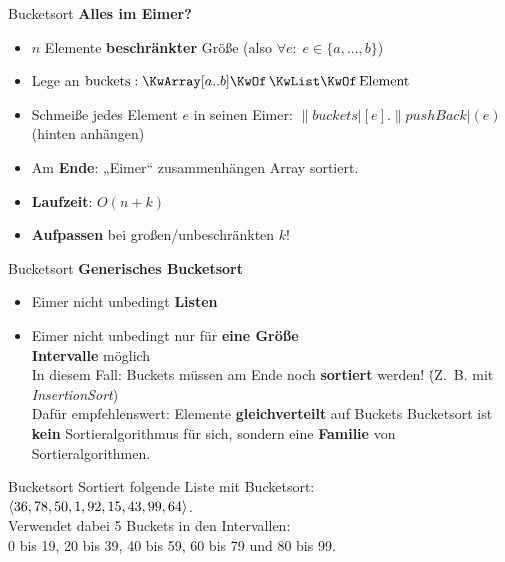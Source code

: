
\begin{frame}{Bucketsort}
	\textbf{Alles im Eimer?} \\
	\begin{itemize}
		\item $n$ Elemente \textbf{beschränkter} Größe (also $\forall e : \; e \in \{a, ..., b\} $)
		\pause
		\item Lege an \: $\|buckets|: \KwArray[a..b] \KwOf \KwListOf \|Element|$ \quad \only<4->{($k := \abs{\|buckets|}$)}
		\item Schmeiße jedes Element $e$ in seinen Eimer: $\|buckets|[e].\|pushBack|(e)$ (hinten anhängen)
		\pause
		\item Am \textbf{Ende}: „Eimer“ zusammenhängen
		\implitem Array sortiert. 
		\pause
		\item \textbf{Laufzeit}: $O(n+k)$
		\item \textbf{Aufpassen} bei großen/unbeschränkten $k$!
	\end{itemize}
\end{frame}

\begin{frame}{Bucketsort}
	\textbf{Generisches Bucketsort} \\
	\begin{itemize}
		\item Eimer nicht unbedingt \textbf{Listen}
		\item Eimer nicht unbedingt nur für \textbf{eine Größe} \\
		\impl \textbf{Intervalle} möglich \\
		\§{\impl} In diesem Fall: Buckets müssen am Ende noch \textbf{sortiert} werden! 
		\. (Z.~B. mit \emph{InsertionSort}) \\
		\impl Dafür empfehlenswert: Elemente \textbf{gleichverteilt} auf Buckets
		\implitem Bucketsort ist \textbf{kein} Sortieralgorithmus für sich, sondern eine \textbf{Familie} von Sortieralgorithmen. 
	\end{itemize}
\end{frame}


\begin{frame}{Bucketsort}
	Sortiert folgende Liste mit Bucketsort: \\ $\langle 36, 78, 50, 1, 92, 15, 43, 99, 64 \rangle$. \\ 
	Verwendet dabei 5 Buckets in den Intervallen: \\
	0 bis 19, 20 bis 39, 40 bis 59, 60 bis 79 und 80 bis 99.
\end{frame}

